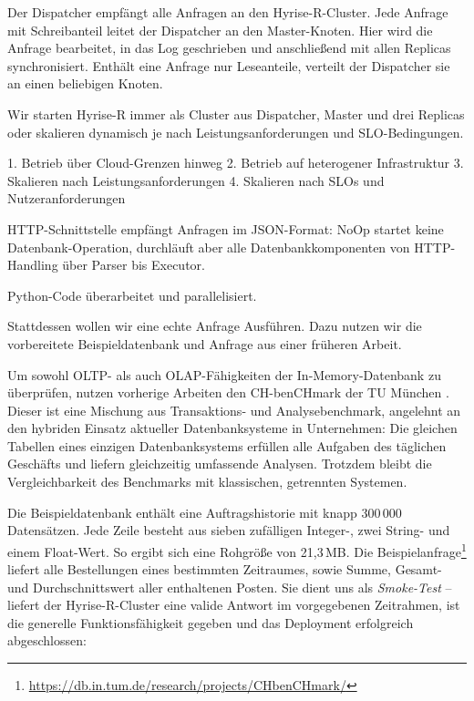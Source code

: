 Der Dispatcher empfängt alle Anfragen an den Hyrise-R-Cluster. Jede Anfrage mit Schreibanteil leitet der Dispatcher an den Master-Knoten. Hier wird die Anfrage bearbeitet, in das Log geschrieben und anschließend mit allen Replicas synchronisiert. Enthält eine Anfrage nur Leseanteile, verteilt der Dispatcher sie an einen beliebigen Knoten.

Wir starten Hyrise-R immer als Cluster aus Dispatcher, Master und drei Replicas oder skalieren dynamisch je nach Leistungsanforderungen und SLO-Bedingungen.

1. Betrieb über Cloud-Grenzen hinweg
2. Betrieb auf heterogener Infrastruktur
3. Skalieren nach Leistungsanforderungen
4. Skalieren nach SLOs und Nutzeranforderungen

HTTP-Schnittstelle empfängt Anfragen im JSON-Format: NoOp startet keine Datenbank-Operation, durchläuft aber alle Datenbankkomponenten von HTTP-Handling über Parser bis Executor.

Python-Code überarbeitet und parallelisiert.


Stattdessen wollen wir eine echte Anfrage Ausführen. Dazu nutzen wir die vorbereitete Beispieldatenbank und Anfrage aus einer früheren Arbeit.

Um sowohl OLTP- als auch OLAP-Fähigkeiten der In-Memory-Datenbank zu überprüfen, nutzen vorherige Arbeiten \cite{ssiclops:d42:experiments-measurements} den CH-benCHmark der TU München \cite{cole:2011:db-benchmark}. Dieser ist eine Mischung aus Transaktions- und Analysebenchmark, angelehnt an den hybriden Einsatz aktueller Datenbanksysteme in Unternehmen: Die gleichen Tabellen eines einzigen Datenbanksystems erfüllen alle Aufgaben des täglichen Geschäfts und liefern gleichzeitig umfassende Analysen. Trotzdem bleibt die Vergleichbarkeit des Benchmarks mit klassischen, getrennten Systemen.

Die Beispieldatenbank enthält eine Auftragshistorie mit knapp 300\,000 Datensätzen. Jede Zeile besteht aus sieben zufälligen Integer-, zwei String- und einem Float-Wert. So ergibt sich eine Rohgröße von 21,3\,MB. Die Beispielanfrage\footnote{\url{https://db.in.tum.de/research/projects/CHbenCHmark/}} liefert alle Bestellungen eines bestimmten Zeitraumes, sowie Summe, Gesamt- und Durchschnittswert aller enthaltenen Posten. Sie dient uns als \emph{Smoke-Test} -- liefert der Hyrise-R-Cluster eine valide Antwort im vorgegebenen Zeitrahmen, ist die generelle Funktionsfähigkeit gegeben und das Deployment erfolgreich abgeschlossen:

